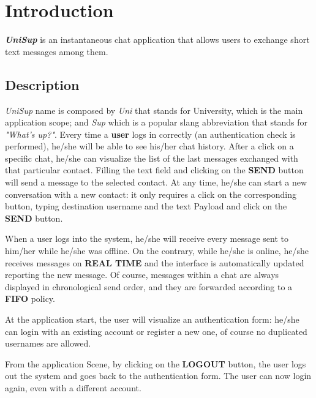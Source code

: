 \section{Introduction}
\textbf{\textit{UniSup}}  is an instantaneous chat application that allows users to exchange short text messages among them.

\subsection{Description}

\textit{UniSup} name is composed by \textit{Uni} that stands for University, which is the main application scope; and \textit{Sup} which is a popular slang abbreviation that stands for \textit{"What’s up?"}.
Every time a \textbf{user} logs in correctly (an authentication check is performed), he/she will be able to see his/her chat history. 
After a click on a specific chat, he/she can visualize the list of the last messages exchanged with that particular contact. Filling the text field and clicking on the \textbf{SEND} button will send a message to the selected contact.
At any time, he/she can start a new conversation with a new contact: it only requires a click on the corresponding button, typing destination username and the text Payload and click on the \textbf{SEND}  button.

When a user logs into the system, he/she will receive every message sent to him/her while he/she was offline. On the contrary, while he/she is online, he/she receives messages on \textbf{REAL TIME} and the interface is automatically updated reporting the new message. Of course, messages within a chat are always displayed in chronological send order, and they are forwarded according to a \textbf{FIFO}  policy.

At the application start, the user will visualize an authentication form: he/she can login with an existing account or register a new one, of course no duplicated usernames are allowed.

From the application Scene, by clicking on the \textbf{LOGOUT}  button, the user logs out the system and goes back to the authentication form. The user can now login again, even with a different account.
\medskip \\
